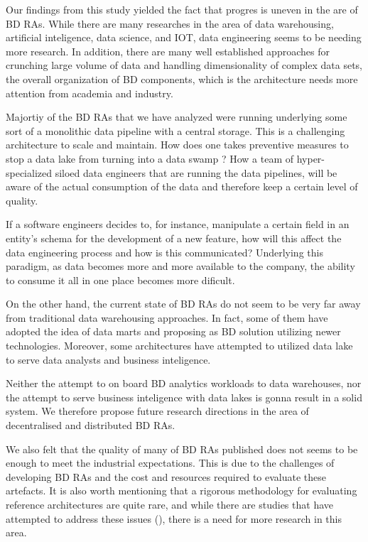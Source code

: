 \documentclass[review]{elsarticle}
\begin{document}
Our findings from this study yielded the fact that progres is uneven in the are of BD RAs. While there are many researches in the area of data warehousing, artificial inteligence, data science, and IOT, data engineering seems to be needing more research. In addition, there are many well established approaches for crunching large volume of data and handling dimensionality of complex data sets, the overall organization of BD components, which is the architecture needs more attention from academia and industry. 

Majortiy of the BD RAs that we have analyzed were running underlying some sort of a monolithic data pipeline with a central storage. This is a challenging architecture to scale and maintain. How does one takes preventive measures to stop a data lake from turning into a data swamp ? How a team of hyper-specialized siloed data engineers that are running the data pipelines, will be aware of the actual consumption of the data and therefore keep a certain level of quality. 

If a software engineers decides to, for instance, manipulate a certain field in an entity's schema for the development of a new feature, how will this affect the data engineering process and how is this communicated?  Underlying this paradigm, as data becomes more and more available to the company, the ability to consume it all in one place becomes more dificult. 

On the other hand, the current state of BD RAs do not seem to be very far away from traditional data warehousing approaches. In fact, some of them have adopted the idea of data marts and proposing as BD solution utilizing newer technologies. Moreover, some architectures have attempted to utilized data lake to serve data analysts and business inteligence. 

Neither the attempt to on board BD analytics workloads to data warehouses, nor the attempt to serve business inteligence with data lakes is gonna result in a solid system. We therefore propose future research directions in the area of decentralised and distributed BD RAs. 

We also felt that the quality of many of BD RAs published does not seems to be enough to meet the industrial expectations. This is due to the challenges of developing BD RAs and the cost and resources required to evaluate these artefacts. It is also worth mentioning that a rigorous methodology for evaluating reference architectures are quite rare, and while there are studies that have attempted to address these issues (\cite{angelov2008towards}), there is a need for more research in this area.
\end{document}

